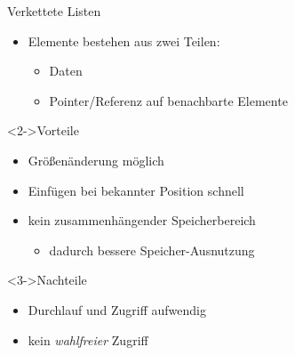 \begin{frame}
    \begin{block}{Verkettete Listen}
        \begin{itemize}
            \item Elemente bestehen aus zwei Teilen:
            \begin{itemize}
                \item Daten
                \item Pointer/Referenz auf benachbarte Elemente
            \end{itemize}
        \end{itemize}
    \end{block}
    \begin{block}<2->{Vorteile}
        \begin{itemize}
            \item Größenänderung möglich
            \item Einfügen bei bekannter Position schnell
            \item kein zusammenhängender Speicherbereich
            \begin{itemize}
                \item dadurch bessere Speicher-Ausnutzung
            \end{itemize}
        \end{itemize}
    \end{block}
    \begin{block}<3->{Nachteile}
        \begin{itemize}
            \item Durchlauf und Zugriff aufwendig
            \item kein \emph{wahlfreier} Zugriff
        \end{itemize}
    \end{block}
\end{frame}
